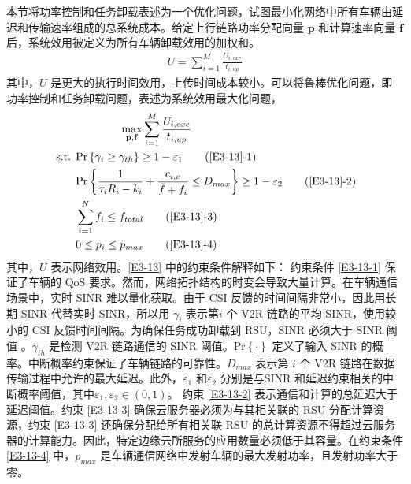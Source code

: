 本节将功率控制和任务卸载表述为一个优化问题，试图最小化网络中所有车辆由延迟和传输速率组成的总系统成本。给定上行链路功率分配向量 $\mathbf{p}$ 和计算速率向量 $\mathbf{f}$ 后，系统效用被定义为所有车辆卸载效用的加权和。
\begin{eqnarray}\label{E12}
U=\sum_{i=1}^{M}\frac{U_{i,exe}}{t_{i,up}}
\end{eqnarray}
其中，$U$ 是更大的执行时间效用，上传时间成本较小。可以将鲁棒优化问题，即功率控制和任务卸载问题，表述为系统效用最大化问题，
\begin{align}
 &\qquad\qquad\max\limits_{\mathbf{p},\mathbf{f}}\sum_{i=1}^{M}\frac{U_{i,exe}}{t_{i,up}}                                   \label{E3-13}\\
\text { s.t. }
& \textrm{Pr}\left\{\gamma_i\geq\gamma_{th}\right\}\geq1-\varepsilon_1                                         \tag{\ref{E3-13}{-1}}      \label{E3-13-1}\\  %
& \textrm{Pr}\left\{\frac{1}{\tau_iR_i-k_i}+\frac{c_{i,e}}{\bar{f}+f_i}\le D_{max}\right\}\geq1-\varepsilon_2  \tag{\ref{E3-13}{-2}}      \label{E3-13-2}\\  %
& \sum_{i=1}^{N}f_i\le f_{total}                                                                                \tag{\ref{E3-13}{-3}}      \label{E3-13-3}\\  %
& 0 \le p_i\le p_{max}                                                                                          \tag{\ref{E3-13}{-4}}      \label{E3-13-4} %
\end{align}
其中，$U$ 表示网络效用。\eqref{E3-13} 中的约束条件解释如下： 约束条件 \eqref{E3-13-1} 保证了车辆的 QoS 要求。然而，网络拓扑结构的时变会导致大量计算。在车辆通信场景中，实时 SINR 难以量化获取。由于 CSI 反馈的时间间隔非常小，因此用长期 SINR 代替实时 SINR，所以用 $\gamma_i$ 表示第$i$ 个 V2R {链路的平均 SINR，使用较小的 CSI 反馈时间间隔}。为确保任务成功卸载到 RSU，SINR 必须大于 SINR 阈值 \cite{liu2021}。$\gamma_{th}$ 是检测 V2R 链路通信的 SINR 阈值。$\textrm{Pr}\left\{\cdot\right\}$ 定义了输入 SINR 的概率。中断概率约束保证了车辆链路的可靠性。$D_{max}$ 表示第 $i$ 个 V2R 链路在数据传输过程中允许的最大延迟。此外，$\varepsilon_1$ 和$\varepsilon_2$ 分别是与SINR 和延迟约束相关的中断概率阈值，其中$\varepsilon_1,\varepsilon_2\in\left(0,1\right)$。 约束 \eqref{E3-13-2} 表示通信和计算的总延迟大于延迟阈值。约束 \eqref{E3-13-3} 确保云服务器必须为与其相关联的 RSU 分配计算资源，约束 \eqref{E3-13-3} 还确保分配给所有相关联 RSU 的总计算资源不得超过云服务器的计算能力。因此，特定边缘云所服务的应用数量必须低于其容量。在约束条件 \eqref{E3-13-4} 中，$p_{max}$ 是车辆通信网络中发射车辆的最大发射功率，且发射功率大于零。

